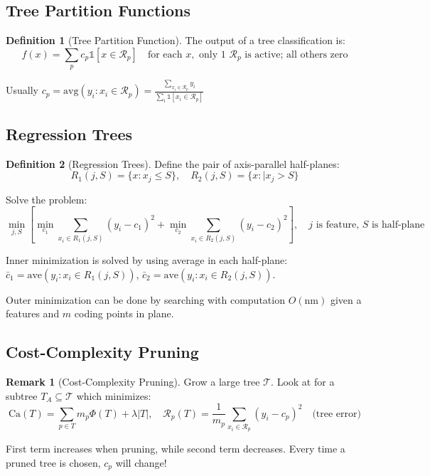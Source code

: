 \documentclass[12pt,a4paper]{article}
\theoremstyle{definition}
\newtheorem{definition}{Definition}[section]
\newtheorem{remark}{Remark}[section]
\begin{document}
\subsection{Tree Partition Functions}

\begin{definition}[Tree Partition Function]
The output of a tree classification is:
\[
f(x) = \sum_p c_p \mathbb{1}[x \in \mathcal{R}_p] \quad \text{for each } x, \text{ only 1 } \mathcal{R}_p \text{ is active; all others zero}
\]

Usually $c_p = \text{avg}(y_i : x_i \in \mathcal{R}_p) = \frac{\sum_{x_i \in \mathcal{R}_p} y_i}{\sum_i \mathbb{1}[x_i \in \mathcal{R}_p]}$
\end{definition}

\subsection{Regression Trees}

\begin{definition}[Regression Trees]
Define the pair of axis-parallel half-planes:
\[
R_1(j, S) = \{x : x_j \leq S\}, \quad R_2(j, S) = \{x : |x_j > S\}
\]

Solve the problem:
\[
\min_{j,S} \left[\min_{c_1} \sum_{x_i \in R_1(j,S)} (y_i - c_1)^2 + \min_{c_2} \sum_{x_i \in R_2(j,S)} (y_i - c_2)^2\right], \quad j \text{ is feature, } S \text{ is half-plane}
\]

Inner minimization is solved by using average in each half-plane: $\bar{c}_1 = \text{ave}(y_i : x_i \in R_1(j, S))$, $\bar{c}_2 = \text{ave}(y_i : x_i \in R_2(j, S))$.

Outer minimization can be done by searching with computation $O(\text{nm})$ given a features and $m$ coding points in plane.
\end{definition}

\subsection{Cost-Complexity Pruning}

\begin{remark}[Cost-Complexity Pruning]
Grow a large tree $\mathcal{T}$. Look at for a subtree $T_A \subseteq \mathcal{T}$ which minimizes:
\[
\text{Ca}(T) = \sum_{p \in T} m_p \varPhi(T) + \lambda |T|, \quad \mathcal{R}_p(T) = \frac{1}{m_p} \sum_{x_i \in \mathcal{R}_p} (y_i - c_p)^2 \quad \text{(tree error)}
\]

First term increases when pruning, while second term decreases. Every time a pruned tree is chosen, $c_p$ will change!
\end{remark}
\end{document}
